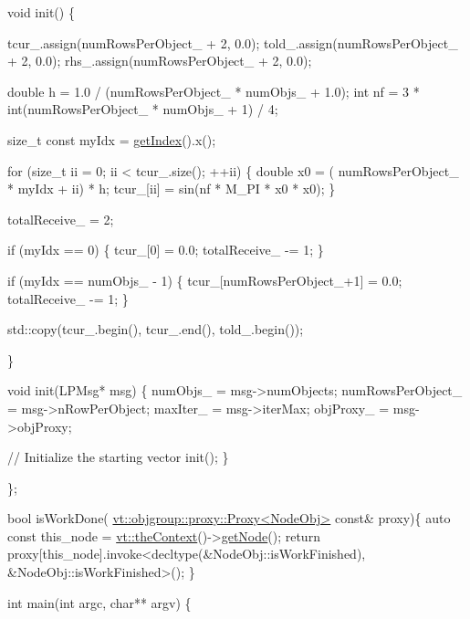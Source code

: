\begin{DoxyCodeInclude}
  \textcolor{keywordtype}{void} init() \{

    tcur\_.assign(numRowsPerObject\_ + 2, 0.0);
    told\_.assign(numRowsPerObject\_ + 2, 0.0);
    rhs\_.assign(numRowsPerObject\_ + 2, 0.0);

    \textcolor{keywordtype}{double} h = 1.0 / (numRowsPerObject\_ * numObjs\_ + 1.0);
    \textcolor{keywordtype}{int} nf = 3 * int(numRowsPerObject\_ * numObjs\_ + 1) / 4;

    \textcolor{keywordtype}{size\_t} \textcolor{keyword}{const} myIdx = \hyperlink{namespacecheckpoint_1_1dispatch_1_1typeregistry_aa75ef84e9b63a687784360ded2d56fe4}{getIndex}().x();

    \textcolor{keywordflow}{for} (\textcolor{keywordtype}{size\_t} ii = 0; ii < tcur\_.size(); ++ii) \{
      \textcolor{keywordtype}{double} x0 = ( numRowsPerObject\_ * myIdx + ii) * h;
      tcur\_[ii] = sin(nf * M\_PI * x0 * x0);
    \}

    totalReceive\_ = 2;

    \textcolor{keywordflow}{if} (myIdx == 0) \{
      tcur\_[0] = 0.0;
      totalReceive\_ -= 1;
    \}

    \textcolor{keywordflow}{if} (myIdx == numObjs\_ - 1) \{
      tcur\_[numRowsPerObject\_+1] = 0.0;
      totalReceive\_ -= 1;
    \}

    std::copy(tcur\_.begin(), tcur\_.end(), told\_.begin());

  \}


  \textcolor{keywordtype}{void} init(LPMsg* msg) \{
    numObjs\_ = msg->numObjects;
    numRowsPerObject\_ = msg->nRowPerObject;
    maxIter\_ = msg->iterMax;
    objProxy\_ = msg->objProxy;

    \textcolor{comment}{// Initialize the starting vector}
    init();
  \}

\};

\textcolor{keywordtype}{bool} isWorkDone( \hyperlink{structvt_1_1objgroup_1_1proxy_1_1_proxy}{vt::objgroup::proxy::Proxy<NodeObj>} \textcolor{keyword}{const}& proxy)\{
  \textcolor{keyword}{auto} \textcolor{keyword}{const} this\_node = \hyperlink{namespacevt_a26551fe0e6e6a1371111df5b12c7e92c}{vt::theContext}()->\hyperlink{structvt_1_1ctx_1_1_context_a0d52c263ce8516546a67443d9a86fa5f}{getNode}();
  \textcolor{keywordflow}{return} proxy[this\_node].invoke<decltype(&NodeObj::isWorkFinished), &NodeObj::isWorkFinished>();
\}

\textcolor{keywordtype}{int} main(\textcolor{keywordtype}{int} argc, \textcolor{keywordtype}{char}** argv) \{


\end{DoxyCodeInclude}
